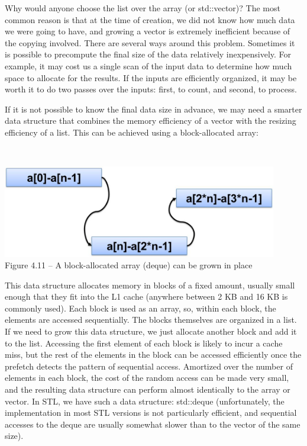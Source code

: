 Why would anyone choose the list over the array (or std::vector)? The most common reason is that at the time of creation, we did not know how much data we were going to have, and growing a vector is extremely inefficient because of the copying involved. There are several ways around this problem. Sometimes it is possible to precompute the final size of the data relatively inexpensively. For example, it may cost us a single scan of the input data to determine how much space to allocate for the results. If the inputs are efficiently organized, it may be worth it to do two passes over the inputs: first, to count, and second, to process.

If it is not possible to know the final data size in advance, we may need a smarter data structure that combines the memory efficiency of a vector with the resizing efficiency of a list. This can be achieved using a block-allocated array:

\hspace*{\fill} \\ %
\begin{center}
\includegraphics[width=0.9\textwidth]{content/1/chapter4/images/11.jpg}\\
Figure 4.11 – A block-allocated array (deque) can be grown in place
\end{center}

This data structure allocates memory in blocks of a fixed amount, usually small enough that they fit into the L1 cache (anywhere between 2 KB and 16 KB is commonly used). Each block is used as an array, so, within each block, the elements are accessed sequentially. The blocks themselves are organized in a list. If we need to grow this data structure, we just allocate another block and add it to the list. Accessing the first element of each block is likely to incur a cache miss, but the rest of the elements in the block can be accessed efficiently once the prefetch detects the pattern of sequential access. Amortized over the number of elements in each block, the cost of the random access can be made very small, and the resulting data structure can perform almost identically to the array or vector. In STL, we have such a data structure: std::deque (unfortunately, the implementation in most STL versions is not particularly efficient, and sequential accesses to the deque are usually somewhat slower than to the vector of the same size).

